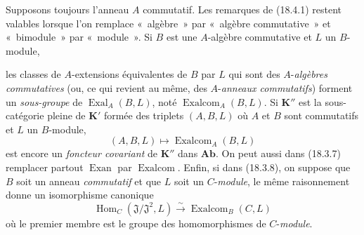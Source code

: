 \begin{env}[18.4.2]
\label{0.18.4.2-fr}
Supposons toujours l'anneau $A$ commutatif. Les remarques de (18.4.1) restent
valables lorsque l'on remplace «~algèbre~» par «~algèbre commutative~» et
«~bimodule~» par «~module~». Si $B$ est une $A$-algèbre commutative et $L$ un
$B$-module,


les classes de $A$-extensions équivalentes de $B$ par $L$ qui sont des
$A$-\emph{algèbres commutatives} (ou, ce qui revient au même, des
$A$-\emph{anneaux commutatifs}) forment un \emph{sous-groupe} de
$\operatorname{Exal}_A(B,L)$, noté $\operatorname{Exalcom}_A(B,L)$. Si
$\mathbf K''$ est la sous-catégorie pleine de $\mathbf K'$ formée des triplets
$(A,B,L)$ où $A$ et $B$ sont commutatifs et $L$ un $B$-module,
\[
  (A,B,L)\longmapsto\operatorname{Exalcom}_A(B,L)
\]
est encore un \emph{foncteur covariant} de $\mathbf K''$ dans $\mathbf{Ab}$. On
peut aussi dans (18.3.7) remplacer partout $\operatorname{Exan}$ par
$\operatorname{Exalcom}$. Enfin, si dans (18.3.8), on suppose que $B$ soit un
anneau \emph{commutatif} et que $L$ soit un $C$-\emph{module}, le même
raisonnement donne un isomorphisme canonique
\begin{equation}
\label{0.18.4.2.1-fr}
\tag{18.4.2.1}
  \operatorname{Hom}_C(\mathfrak J/\mathfrak J^2,L)
  \xrightarrow{\sim}\operatorname{Exalcom}_B(C,L)
\end{equation}
où le premier membre est le groupe des homomorphismes de $C$-\emph{module}.
\end{env}

